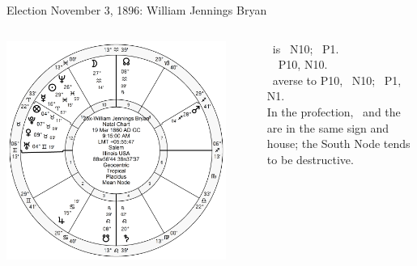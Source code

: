 \begin{frame}[t]{Election November 3, 1896: William Jennings Bryan}
\small
\begin{columns}[T, onlytextwidth]
\vspace{-1em}
{\includegraphics[width=0.9\textwidth]{charts/Bryan.png}}
\fontsize{8pt}{9pt}\selectfont

\Mercury\, is \Sextile\, N10; \Sextile\, P1. \\
\Jupiter\, \Trine\, P10, N10. \\
\Saturn\, averse to P10, \Opposition\, N10; \Sextile\, P1, N1. \\
In the profection, \Saturn\, and the \SouthNode\, are in the same sign and house; the South Node tends to be destructive.


\end{columns}
\end{frame}
